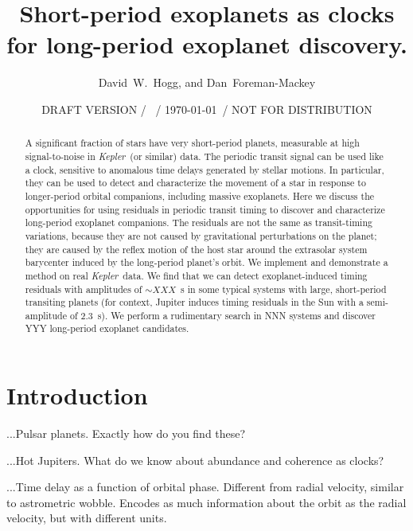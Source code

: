 \documentclass[12pt, preprint]{aastex}
\newcounter{affil}
\newcommand{\project}[1]{\textsl{#1}}
\newcommand{\Kepler}{\project{Kepler}}
\begin{document}
\title{
  Short-period exoplanets as clocks for long-period exoplanet discovery.
}
\author{
  David~W.~Hogg\altaffilmark{\ref{ccpp},\ref{cds},\ref{mpia},\ref{email}},
  and
  Dan~Foreman-Mackey\altaffilmark{\ref{ccpp}}
}
\date{DRAFT VERSION / \texttt{\githash}\ / \today\ / NOT FOR DISTRIBUTION}
\label{ccpp}
\label{cds}
\label{mpia}
\label{email}

\begin{abstract}
A significant fraction of stars have very short-period planets,
measurable at high signal-to-noise in \Kepler\ (or similar) data.
The periodic transit signal can be used like a clock, sensitive to
anomalous time delays generated by stellar motions.
In particular, they can be used to detect and characterize the
movement of a star in response to longer-period orbital companions,
including massive exoplanets.
Here we discuss the opportunities for using residuals in periodic
transit timing to discover and characterize long-period exoplanet
companions.
The residuals are not the same as transit-timing variations, because
they are not caused by gravitational perturbations on the planet; they
are caused by the reflex motion of the host star around the extrasolar
system barycenter induced by the long-period planet's orbit.
We implement and demonstrate a method on real \Kepler\ data.  We find
that we can detect exoplanet-induced timing residuals with amplitudes
of $\sim XXX$~s in some typical systems with large, short-period
transiting planets (for context, Jupiter induces timing residuals in
the Sun with a semi-amplitude of 2.3~s).
We perform a rudimentary search in NNN systems and discover YYY
long-period exoplanet candidates.
\end{abstract}

\section{Introduction}

...Pulsar planets.  Exactly how do you find these?

...Hot Jupiters.  What do we know about abundance and coherence as
clocks?

...Time delay as a function of orbital phase.  Different from radial
velocity, similar to astrometric wobble.  Encodes as much information
about the orbit as the radial velocity, but with different units.
\end{document}
